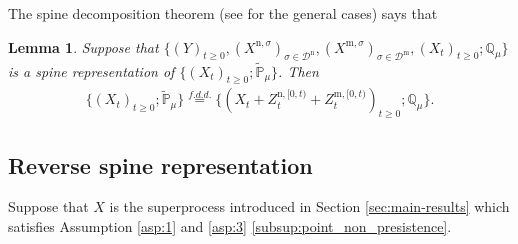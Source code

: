 \documentclass[12pt,a4paper]{amsart}
\numberwithin{equation}{section}
\theoremstyle{plain}
\newtheorem{lem}[thm]{Lemma}
\theoremstyle{definition}
\begin{document}
The spine decomposition theorem (see \cite{RenSongSun2019Spine} for the general
cases) says that
\begin{lem}\label{lem:spine_structure}
	Suppose that $\{(Y)_{t\geq 0}, (X^{\mathrm n, \sigma})_{\sigma\in \mathcal
    D^\mathrm n}, (X^{\mathrm m, \sigma})_{\sigma \in \mathcal D^\mathrm m},
  (X_t)_{t\geq 0}; \mathbb Q_{\mu}\}$ is a spine representation of
  $\{(X_t)_{t\geq 0}; \widetilde {\mathbb P}_\mu\}$. Then
  \begin{align}
    \{(X_t)_{t\geq 0}; \widetilde{\mathbb P}_\mu\}
    \overset{f.d.d.}{=}
    \{(X_t + Z^{\mathrm n, [0,t)}_{t} + Z^{\mathrm m, [0,t)}_{t} )_{t\geq 0}; \mathbb Q_\mu\}.
  \end{align}
\end{lem}

\subsection{Reverse spine representation}

Suppose that $X$ is the superprocess introduced in Section \ref{sec:main-results} which satisfies Assumption \ref{asp:1} and \ref{asp:3} \eqref{subsup:point_non_presistence}.
\end{document}
